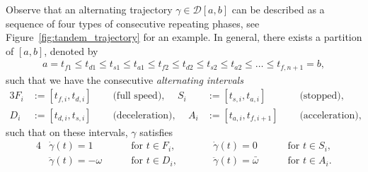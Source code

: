 \documentclass[a4paper]{article}
\theoremstyle{definition}
\theoremstyle{plain}
\begin{document}
Observe that an alternating trajectory $\gamma \in \mathcal{D}[a,b]$ can be described
as a sequence of four types of consecutive repeating phases, see
Figure~\ref{fig:tandem_trajectory} for an example.
%
In general, there exists a partition of $[a,b]$, denoted by
\begin{align*}
  a = t_{f1} \leq t_{d1} \leq t_{s1} \leq t_{a1} \leq t_{f2} \leq t_{d2} \leq t_{s2} \leq t_{a2} \leq \dots \leq t_{f,n+1} = b,
\end{align*}
such that we have the consecutive \emph{alternating intervals}
\begin{alignat*}{3}
  F_{i} &:= [t_{f,i}, t_{d,i}] \quad &\text{ (full speed), } \quad
  S_{i} &:= [t_{s,i}, t_{a,i}] \quad &\text{ (stopped), } \\
  D_{i} &:= [t_{d,i}, t_{s,i}] \quad &\text{ (deceleration), } \quad
  A_{i} &:= [t_{a,i}, t_{f,i+1}] \quad  &\text{ (acceleration), }
\end{alignat*}
%
such that on these intervals, $\gamma$ satisfies
%
\begin{alignat*}{4}
  &\dot{\gamma}(t) = 1 && \text{ for } t \in F_{i} , \quad \quad
  &&\dot{\gamma}(t) = 0 && \text{ for } t \in S_{i} ,\\
  &\ddot{\gamma}(t) = -\omega \quad && \text{ for } t \in D_{i} , \quad \quad
  &&\ddot{\gamma}(t) = \bar{\omega} \quad && \text{ for } t \in A_{i} .
\end{alignat*}
\end{document}
